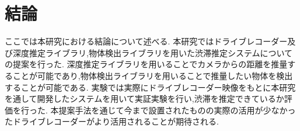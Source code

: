 \chapter{結論}
ここでは本研究における結論について述べる.
本研究ではドライブレコーダー及び深度推定ライブラリ,物体検出ライブラリを用いた渋滞推定システムについての提案を行った.
深度推定ライブラリを用いることでカメラからの距離を推量することが可能であり,物体検出ライブラリを用いることで推量したい物体を検出することが可能である.
実験では実際にドライブレコーダー映像をもとに本研究を通して開発したシステムを用いて実証実験を行い,渋滞を推定できているか評価を行った.
本提案手法を通じて今まで設置されたものの実際の活用が少なかったドライブレコーダーがより活用されることが期待される.